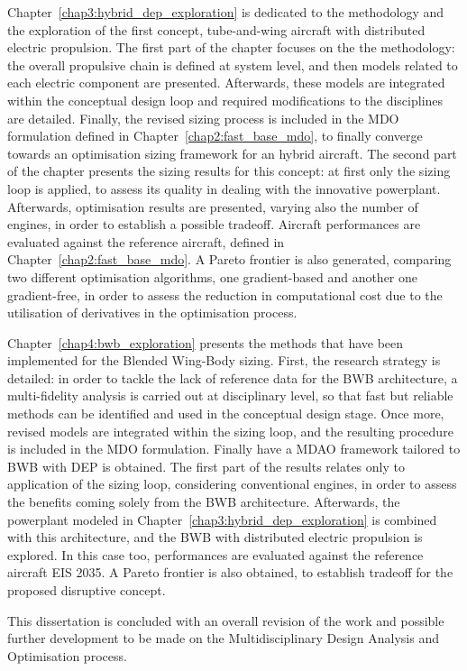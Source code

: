 Chapter~\ref{chap3:hybrid_dep_exploration} is dedicated to the methodology and the exploration of the first concept, tube-and-wing aircraft with distributed electric propulsion. 
The first part of the chapter focuses on the the methodology: the overall propulsive chain is defined at system level, and then models related to each electric component are presented. 
Afterwards, these models are integrated within the conceptual design loop and required modifications to the disciplines are detailed.  
Finally, the revised sizing process is included in the MDO formulation defined in Chapter~\ref{chap2:fast_base_mdo}, to finally converge towards an optimisation sizing framework for an hybrid aircraft. 
The second part of the chapter presents the sizing results for this concept: at first only the sizing loop is applied, to assess its quality in dealing with the innovative powerplant.
Afterwards, optimisation results are presented, varying also the number of engines, in order to establish a possible tradeoff. 
Aircraft performances are evaluated against the reference aircraft, defined in Chapter~\ref{chap2:fast_base_mdo}. 
A Pareto frontier is also generated, comparing two different optimisation algorithms, one gradient-based and another one gradient-free, in order to assess the reduction in computational cost due to the utilisation of derivatives in the optimisation process. 

Chapter~\ref{chap4:bwb_exploration} presents the methods that have been implemented for the Blended Wing-Body sizing. 
First, the research strategy is detailed: in order to tackle the lack of reference data for the BWB architecture, a multi-fidelity analysis is carried out at disciplinary level, so that fast but reliable methods can be identified and used in the conceptual design stage. 
Once more, revised models are integrated within the sizing loop, and the resulting procedure is included in the MDO formulation. 
Finally have a MDAO framework tailored to BWB with DEP is obtained. 
The first part of the results relates only to application of the sizing loop, considering conventional engines, in order to assess the benefits coming solely from the BWB architecture. 
Afterwards, the powerplant modeled in Chapter~\ref{chap3:hybrid_dep_exploration} is combined with this architecture, and the BWB with distributed electric propulsion is explored. 
In this case too, performances are evaluated against the reference aircraft EIS 2035. 
A Pareto frontier is also obtained, to establish tradeoff for the proposed disruptive concept. 

This dissertation is concluded with an overall revision of the work and possible further development to be made on the Multidisciplinary Design Analysis and Optimisation process. 